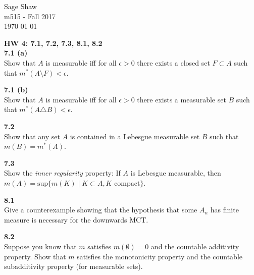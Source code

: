 \documentclass[12pt]{article}
\newcommand{\problem}[1]{\hspace{-4 ex} \large \textbf{#1}\\}
\begin{document}
	\thispagestyle{empty}
	
	\begin{flushright}
		Sage Shaw \\
		m515 - Fall 2017 \\
		\today
	\end{flushright}
	
\large{\textbf{HW 4: 7.1, 7.2, 7.3, 8.1, 8.2}}\\

\problem{7.1 (a)} Show that $A$ is measurable iff for all $\epsilon>0$ there exists a closed set $F\subset A$ such that $m^*(A\setminus F)<\epsilon$.

\problem{7.1 (b)} Show that $A$ is measurable iff for all $\epsilon>0$ there exists a measurable set $B$ such that $m^*(A\triangle B)<\epsilon$.

\problem{7.2} Show that any set $A$ is contained in a Lebesgue measurable set $B$ such that $m(B)=m^*(A)$.

\problem{7.3} Show the \emph{inner regularity} property: If $A$ is Lebesgue measurable, then $m(A)=\text{sup}\{m(K)\mid K\subset A, K\text{ compact}\}$.

\problem{8.1} Give a counterexample showing that the hypothesis that some $A_n$ has finite measure is necessary for the downwards MCT.

\problem{8.2} Suppose you know that $m$ satisfies $m(\emptyset)=0$ and the countable additivity property. Show that $m$ satisfies the monotonicity property and the countable subadditivity property (for measurable sets).
\end{document}
